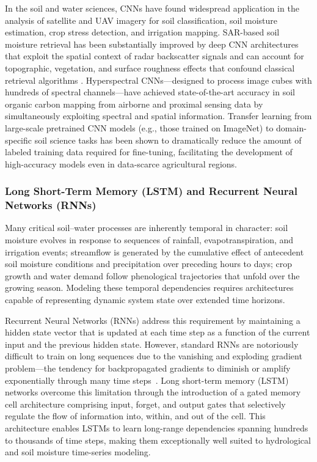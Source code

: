 \documentclass[land,review,accept,pdftex,oneauthor]{Definitions/mdpi}
\begin{document}
In the soil and water sciences, CNNs have found widespread application in the analysis of satellite and UAV imagery for soil classification, soil moisture estimation, crop stress detection, and irrigation mapping. SAR-based soil moisture retrieval has been substantially improved by deep CNN architectures that exploit the spatial context of radar backscatter signals and can account for topographic, vegetation, and surface roughness effects that confound classical retrieval algorithms \citep{hajj2017soil,Lemenkova202402}. Hyperspectral CNNs---designed to process image cubes with hundreds of spectral channels---have achieved state-of-the-art accuracy in soil organic carbon mapping from airborne and proximal sensing data by simultaneously exploiting spectral and spatial information. Transfer learning from large-scale pretrained CNN models (e.g., those trained on ImageNet) to domain-specific soil science tasks has been shown to dramatically reduce the amount of labeled training data required for fine-tuning, facilitating the development of high-accuracy models even in data-scarce agricultural regions.

\subsubsection{Long Short-Term Memory (LSTM) and Recurrent Neural Networks (RNNs)}

Many critical soil--water processes are inherently temporal in character: soil moisture evolves in response to sequences of rainfall, evapotranspiration, and irrigation events; streamflow is generated by the cumulative effect of antecedent soil moisture conditions and precipitation over preceding hours to days; crop growth and water demand follow phenological trajectories that unfold over the growing season. Modeling these temporal dependencies requires architectures capable of representing dynamic system state over extended time horizons.

Recurrent Neural Networks (RNNs) address this requirement by maintaining a hidden state vector that is updated at each time step as a function of the current input and the previous hidden state. However, standard RNNs are notoriously difficult to train on long sequences due to the vanishing and exploding gradient problem---the tendency for backpropagated gradients to diminish or amplify exponentially through many time steps~\citep{bengio1994learning}. Long short-term memory (LSTM) networks \citep{Hochreiter1997,Greff2017} overcome this limitation through the introduction of a gated memory cell architecture comprising input, forget, and output gates that selectively regulate the flow of information into, within, and out of the cell. This architecture enables LSTMs to learn long-range dependencies spanning hundreds to thousands of time steps, making them exceptionally well suited to hydrological and soil moisture time-series modeling.
\end{document}
